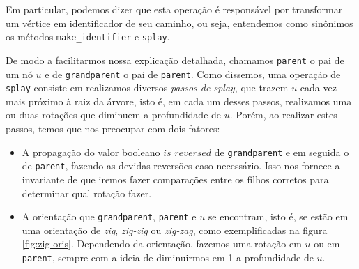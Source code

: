 Em particular, podemos dizer que esta operação é responsável por transformar um vértice em identificador de seu caminho, ou seja, entendemos como sinônimos os métodos \texttt{make\_identifier} e \texttt{splay}.

De modo a facilitarmos nossa explicação detalhada, chamamos \texttt{parent} o pai de um nó $u$ e de \texttt{grandparent} o pai de \texttt{parent}. Como dissemos, uma operação de \texttt{splay} consiste em realizamos diversos \emph{passos de splay}, que trazem $u$ cada vez mais próximo à raiz da árvore, isto é, em cada um desses passos, realizamos uma ou duas rotações que diminuem a profundidade de $u$. Porém, ao realizar estes passos, temos que nos preocupar com dois fatores:

\begin{itemize}
    \item A propagação do valor booleano $is\_reversed$ de \texttt{grandparent} e em seguida o de \texttt{parent}, fazendo as devidas reversões caso necessário. Isso nos fornece a invariante de que iremos fazer comparações entre os filhos corretos para determinar qual rotação fazer.
    \item A orientação que \texttt{grandparent}, \texttt{parent} e $u$ se encontram, isto é, se estão em uma orientação de \textit{zig}, \textit{zig-zig} ou \textit{zig-zag}, como exemplificadas na figura \ref{fig:zig-oris}. Dependendo da orientação, fazemos uma rotação em $u$ ou em \texttt{parent}, sempre com a ideia de diminuirmos em 1 a profundidade de $u$.
\end{itemize}

